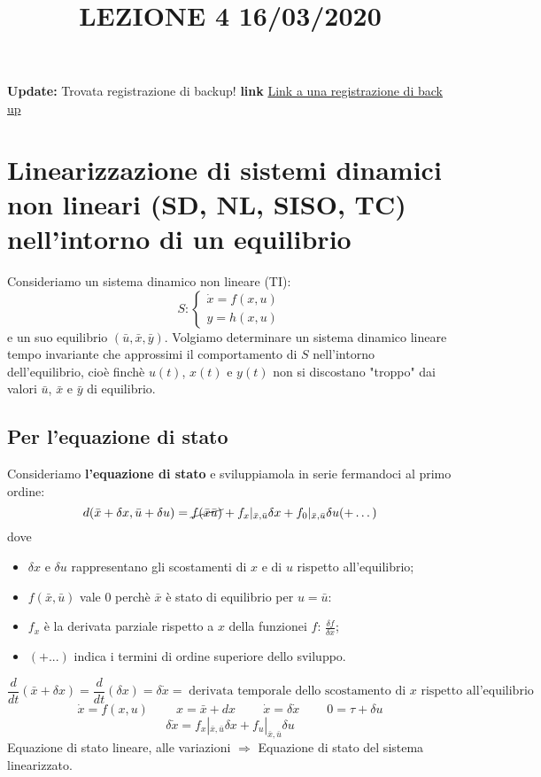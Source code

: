 \newpage
\title{LEZIONE 4 16/03/2020} \newline
\textbf{Update:} Trovata registrazione di backup! \newline
\textbf{link} \href{https://onedrive.live.com/?authkey=%21AATVJK3srNwxGzs&id=EE092FF4FF7B5B0E%212158&cid=EE092FF4FF7B5B0E}{Link a una registrazione di back up}
\section{Linearizzazione di sistemi dinamici non lineari (SD, NL, SISO, TC) nell'intorno di un equilibrio}
Consideriamo un sistema dinamico non lineare (TI):
\[
    S: \begin{cases}
        \dot{x} = f(x,u)\\
        y = h(x,u)
    \end{cases}
\]
e un suo equilibrio $(\bar{u}, \bar{x}, \bar{y})$.\newline
\newline
Volgiamo determinare un sistema dinamico lineare tempo invariante che approssimi il comportamento di $S$ nell'intorno dell'equilibrio, cioè finchè $u(t)$, $x(t)$ e $y(t)$ non si discostano "troppo" dai valori $\bar{u}$, $\bar{x}$ e $\bar{y}$ di equilibrio.
\subsection{Per l'equazione di stato}
Consideriamo \textbf{l'equazione di stato} e sviluppiamola in serie fermandoci al primo ordine:
\[
    d(\bar{x} + \delta x, \bar{u} + \delta u) = \cancel{ f(\bar{x} \bar{u})} + f_x|_{\bar{x}, \bar{u}}\delta x + f_0|_{\bar{x}, \bar{u}} \delta u (+ \dots)
\]
dove
\begin{itemize}
    \item $\delta x$ e $\delta u$ rappresentano gli scostamenti di $x$ e di $u$ rispetto all'equilibrio;
    \item $f(\bar{x}, \bar{u})$ vale $0$ perchè $\bar{x}$ è stato di equilibrio per $u = \bar{u}$:
    \item $f_x$ è la derivata parziale rispetto a $x$ della funzionei $f$: $\frac{\delta f}{\delta x}$;
    \item $(+ ...)$ indica i termini di ordine superiore dello sviluppo.
\end{itemize}
\[
    \frac{d}{dt} (\bar{x} + \delta x) = \frac{d}{dt} (\delta x) = \delta \dot{x} = \; \text{derivata temporale dello scostamento di $x$ rispetto all'equilibrio}\;
\]
\[
    \dot{x} = f(x,u) \;\;\;\;\;\;\;\; x = \bar{x} + dx \;\;\;\;\;\;\;\; \dot{x} = \delta \dot{x} \;\;\;\;\;\;\;\; 0 = \tau + \delta u
\]
\[
    \delta \dot{x} = f_x|_{\bar{x}, \bar{u}} \delta x + f_u |_{\bar{x}, \bar{u}} \delta u
\]
Equazione di stato lineare, alle variazioni $\Longrightarrow$ Equazione di stato del sistema linearizzato.
